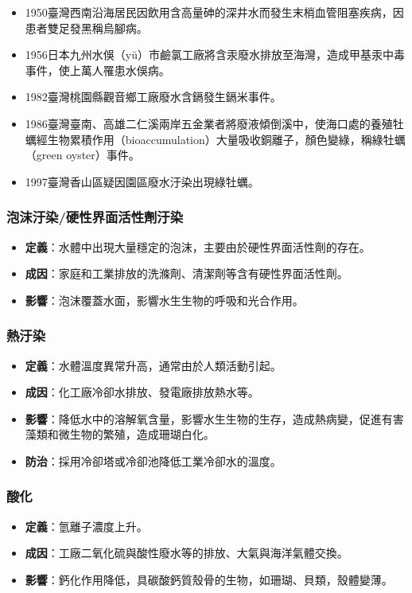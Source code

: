 \documentclass[a4paper,12pt]{report}
\begin{document}
\begin{itemize}
\begin{itemize}
\begin{itemize}
    \item 1950臺灣西南沿海居民因飲用含高量砷的深井水而發生末梢血管阻塞疾病，因患者雙足發黑稱烏腳病。
        \item 1956日本九州水俁（yŭ）市鹼氯工廠將含汞廢水排放至海灣，造成甲基汞中毒事件，使上萬人罹患水俁病。
        \item 1982臺灣桃園縣觀音鄉工廠廢水含鎘發生鎘米事件。
        \item 1986臺灣臺南、高雄二仁溪兩岸五金業者將廢液傾倒溪中，使海口處的養殖牡蠣經生物累積作用（bioaccumulation）大量吸收銅離子，顏色變綠，稱綠牡蠣（green oyster）事件。
        \item 1997臺灣香山區疑因園區廢水汙染出現綠牡蠣。
    \end{itemize}
\end{itemize}
\subsubsection{泡沫汙染/硬性界面活性劑汙染}
\begin{itemize}
    \item \textbf{定義}：水體中出現大量穩定的泡沫，主要由於硬性界面活性劑的存在。
    \item \textbf{成因}：家庭和工業排放的洗滌劑、清潔劑等含有硬性界面活性劑。
    \item \textbf{影響}：泡沫覆蓋水面，影響水生生物的呼吸和光合作用。
\end{itemize}
\subsubsection{熱汙染}
\begin{itemize}
    \item \textbf{定義}：水體溫度異常升高，通常由於人類活動引起。
    \item \textbf{成因}：化工廠冷卻水排放、發電廠排放熱水等。
    \item \textbf{影響}：降低水中的溶解氧含量，影響水生生物的生存，造成熱病變，促進有害藻類和微生物的繁殖，造成珊瑚白化。
    \item \textbf{防治}：採用冷卻塔或冷卻池降低工業冷卻水的溫度。
\end{itemize}
\subsubsection{酸化}
\begin{itemize}
    \item \textbf{定義}：氫離子濃度上升。
    \item \textbf{成因}：工廠二氧化硫與酸性廢水等的排放、大氣與海洋氣體交換。
    \item \textbf{影響}：鈣化作用降低，具碳酸鈣質殼骨的生物，如珊瑚、貝類，殼體變薄。
\end{itemize}

\end{itemize}
\end{document}
